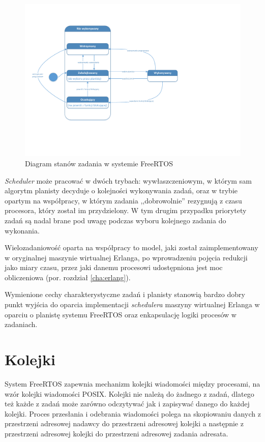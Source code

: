\begin{figure}[h]
\centerline{\includegraphics[scale=0.5]{taskstate}}
\caption{Diagram stanów zadania w systemie FreeRTOS}
\label{fig:taskstate}
\end{figure}


\emph{Scheduler} może pracować w dwóch trybach: wywłaszczeniowym, w którym sam algorytm planisty decyduje o kolejności wykonywania zadań, oraz w trybie opartym na współpracy, w którym zadania ,,dobrowolnie'' rezygnują z czasu procesora, który został im przydzielony. W tym drugim przypadku priorytety zadań są nadal brane pod uwagę podczas wyboru kolejnego zadania do wykonania.

Wielozadaniowość oparta na współpracy to model, jaki został zaimplementowany w oryginalnej maszynie wirtualnej Erlanga, po wprowadzeniu pojęcia redukcji jako miary czasu, przez jaki danemu procesowi udostępniona jest moc obliczeniowa (por. rozdział \ref{cha:erlang}).

Wymienione cechy charakterystyczne zadań i planisty stanowią bardzo dobry punkt wyjścia do oparcia implementacji \emph{schedulera} maszyny wirtualnej Erlanga w oparciu o planistę systemu FreeRTOS oraz enkapsulację logiki procesów w zadaniach.

\section{Kolejki}
\label{sec:rtosKolejki}

System FreeRTOS zapewnia mechanizm kolejki wiadomości między procesami, na wzór kolejki wiadomości POSIX. Kolejki nie należą do żadnego z zadań, dlatego też każde z zadań może zarówno odczytywać jak i zapisywać danego do każdej kolejki. Proces przesłania i odebrania wiadomości polega na skopiowaniu danych z przestrzeni adresowej nadawcy do przestrzeni adresowej kolejki a następnie z przestrzeni adresowej kolejki do przestrzeni adresowej zadania adresata.

